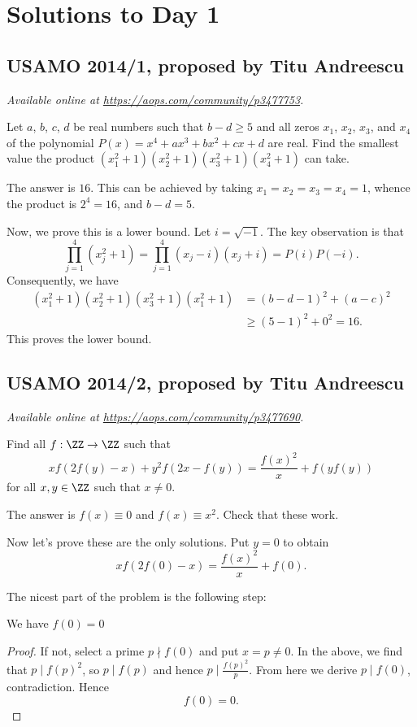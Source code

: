 \documentclass[11pt]{scrartcl}
\begin{document}
\section{Solutions to Day 1}
\subsection{USAMO 2014/1, proposed by Titu Andreescu}
\textsl{Available online at \url{https://aops.com/community/p3477753}.}
\begin{mdframed}[style=mdpurplebox,frametitle={Problem statement}]
Let $a$, $b$, $c$, $d$ be real numbers
such that $b-d \ge 5$ and all zeros
$x_1$, $x_2$, $x_3$, and $x_4$ of the polynomial
$P(x)=x^4+ax^3+bx^2+cx+d$ are real.
Find the smallest value the product
$(x_1^2+1)(x_2^2+1)(x_3^2+1)(x_4^2+1)$ can take.
\end{mdframed}
The answer is $\boxed{16}$.
This can be achieved by taking $x_1 = x_2 = x_3 = x_4 = 1$,
whence the product is $2^4 = 16$, and $b-d = 5$.

Now, we prove this is a lower bound.
Let $i = \sqrt{-1}$.
The key observation is that
\[ \prod_{j=1}^4 \left( x_j^2 + 1 \right)
  = \prod_{j=1}^4 (x_j - i)(x_j + i)
  = P(i)P(-i). \]
Consequently, we have
\begin{align*}
  \left( x_1^2 + 1 \right)
  \left( x_2^2 + 1 \right)
  \left( x_3^2 + 1 \right)
  \left( x_1^2 + 1 \right)
  &= (b-d-1)^2 + (a-c)^2 \\
  &\ge (5-1)^2 + 0^2 = 16.
\end{align*}
This proves the lower bound.
\pagebreak

\subsection{USAMO 2014/2, proposed by Titu Andreescu}
\textsl{Available online at \url{https://aops.com/community/p3477690}.}
\begin{mdframed}[style=mdpurplebox,frametitle={Problem statement}]
Find all $f :\ZZ \to \ZZ$ such that
\[
  xf\left( 2f(y)-x \right) + y^2f\left( 2x-f(y) \right)
  = \frac{f(x)^2}{x} + f\left( yf(y) \right)
\]
for all $x,y \in \ZZ$ such that $x \neq 0$.
\end{mdframed}
The answer is $f(x) \equiv 0$ and $f(x) \equiv x^2$. Check that these work.

Now let's prove these are the only solutions.
Put $y=0$ to obtain
\[ x f\left( 2f(0)-x \right) = \frac{f(x)^2}{x} + f(0).  \]

The nicest part of the problem is the following step:
\begin{claim*}
  We have $f(0)=0$
\end{claim*}
\begin{proof}
  If not, select a prime $p \nmid f(0)$ and put $x=p \neq 0$.
  In the above, we find that $p \mid f(p)^2$,
  so $p \mid f(p)$ and hence $p \mid \tfrac{f(p)^2}{p}$.
  From here we derive $p \mid f(0)$, contradiction.
  Hence \[ f(0) = 0. \]
\end{proof}
\end{document}

